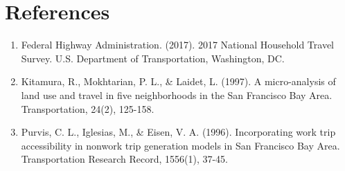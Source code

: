 \documentclass[12pt]{article}
\begin{document}
\section{References}
\begin{enumerate}
\item Federal Highway Administration. (2017). 2017 National Household Travel Survey. U.S. Department of Transportation, Washington, DC.
\item Kitamura, R., Mokhtarian, P. L., \& Laidet, L. (1997). A micro-analysis of land use and travel in five neighborhoods in the San Francisco Bay Area. Transportation, 24(2), 125-158.

\item Purvis, C. L., Iglesias, M., \& Eisen, V. A. (1996). Incorporating work trip accessibility in nonwork trip generation models in San Francisco Bay Area. Transportation Research Record, 1556(1), 37-45.
\end{enumerate}






\vspace{-0.5cm}
\end{document}
